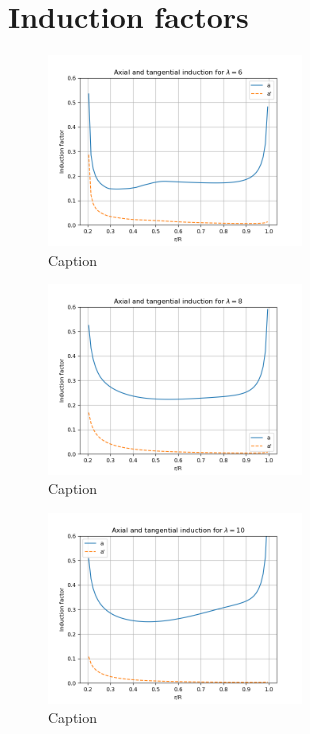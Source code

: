 \section{Induction factors}
\begin{figure}[H]
    \centering
    \includegraphics[width=0.6\textwidth]{Figures/a_a_prime_6.png}
    \caption{Caption}
    \label{fig:enter-label}
\end{figure}
\begin{figure}[H]
    \centering
    \includegraphics[width=0.6\textwidth]{Figures/a_a_p_8.png}
    \caption{Caption}
    \label{fig:enter-label}
\end{figure}
\begin{figure}[H]
    \centering
    \includegraphics[width=0.6\textwidth]{Figures/a_a_p_10.png}
    \caption{Caption}
    \label{fig:enter-label}
\end{figure}


